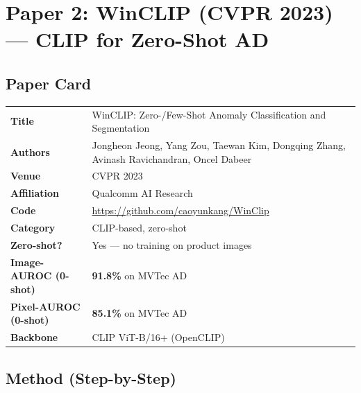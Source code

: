 \documentclass[12pt, a4paper]{article}
\begin{document}

\section{Paper 2: WinCLIP (CVPR 2023) --- CLIP for Zero-Shot AD}

\subsection{Paper Card}
\begin{tabularx}{\textwidth}{@{}lX@{}}
\toprule
\textbf{Title} & WinCLIP: Zero-/Few-Shot Anomaly Classification and Segmentation \\
\textbf{Authors} & Jongheon Jeong, Yang Zou, Taewan Kim, Dongqing Zhang, Avinash Ravichandran, Oncel Dabeer \\
\textbf{Venue} & CVPR 2023 \\
\textbf{Affiliation} & Qualcomm AI Research \\
\textbf{Code} & \url{https://github.com/caoyunkang/WinClip} \\
\textbf{Category} & CLIP-based, zero-shot \\
\textbf{Zero-shot?} & Yes --- no training on product images \\
\textbf{Image-AUROC (0-shot)} & \textbf{91.8\%} on MVTec AD \\
\textbf{Pixel-AUROC (0-shot)} & \textbf{85.1\%} on MVTec AD \\
\textbf{Backbone} & CLIP ViT-B/16+ (OpenCLIP) \\
\bottomrule
\end{tabularx}

\subsection{Method (Step-by-Step)}
\end{document}
